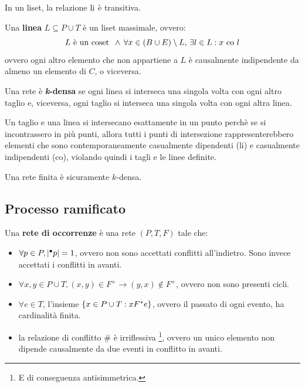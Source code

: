 \begin{rem}
    In un liset, la relazione $\textnormal{li}$ è transitiva.
\end{rem}

\begin{defn}
    Una \textbf{linea} $L \subseteq P \cup T$ è un liset massimale, ovvero:
    \[
        L \textnormal{ è un coset } \, \land \, \forall x \in (B \cup E) \setminus L, \,
        \exists l \in L : x \textnormal{ co } l
    \]
    ovvero ogni altro elemento che non appartiene a $L$ è causalmente
    indipendente da almeno un elemento di $C$, o viceversa.
\end{defn}

\begin{defn}
    Una rete è \textbf{\textit{k}-densa} se ogni linea si interseca una singola
    volta con ogni altro taglio e, viceversa, ogni taglio si interseca una
    singola volta con ogni altra linea.
\end{defn}

Un taglio e una linea si intersecano esattamente in un punto perchè se si
incontrassero in più punti, allora tutti i punti di intersezione
rappresenterebbero elementi che sono contemporaneamente casualmente
dipendenti (li) e casualmente indipendenti (co), violando quindi i tagli
e le linee definite.

\begin{rem}
    Una rete finita è sicuramente $k$-densa.
\end{rem}

\subsection*{Processo ramificato}
\begin{defn}
    Una \textbf{rete di occorrenze} è una rete $(P, T, F)$ tale che:
    \begin{itemize}
        \item $\forall p \in P, |{^\bullet}p| = 1$, ovvero non sono
        accettati conflitti all'indietro. Sono invece accettati
        i conflitti in avanti.
        \item $\forall x, y \in P \cup T, (x,y) \in F^+ \rightarrow
        (y,x) \notin F^+$, ovvero non sono presenti cicli.
        \item $\forall e \in T$, l'insieme $\left\{x \in P \cup T : x F^*e\right\}$,
        ovvero il passato di ogni evento, ha cardinalità finita.
        \item la relazione di conflitto $\#$ è irriflessiva \footnote{E di
        conseguenza antisimmetrica.}, ovvero un unico elemento non dipende
        causalmente da due eventi in conflitto in avanti.
    \end{itemize}
\end{defn}

